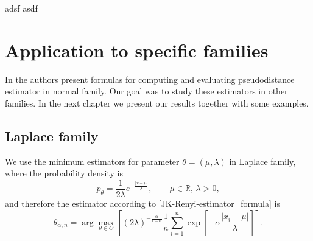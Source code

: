 {\newpage
adsf
\newpage
asdf
\newpage

\section{Application to specific families}

In \cite{Vajda2009} the authors present formulas for computing and evaluating \R pseudodistance estimator in normal family. Our goal was to study these estimators in other families. In the next chapter we present our results together with some examples.


\subsection*{Laplace family}
We use the minimum \R estimators for parameter $\theta = (\mu,\lambda)$ in Laplace family, where the probability density is
\begin{equation}
	p_\theta = \frac{1}{2\lambda} e^{-\frac{|x-\mu|}{\lambda}}, \qquad \mu\in \mathbb{R},\, \lambda>0,
\end{equation}
and therefore the estimator according to \eqref{JK-Renyi-estimator_formula} is
\begin{equation}
	\theta_{\alpha,n} = \arg \max_{\theta \in \Theta} \left[ (2\lambda)^{-\frac{\alpha}{1+\alpha}} \frac{1}{n} \sum_{i=1}^n \exp \left[-\alpha\frac{|x_i-\mu|}{\lambda} \right] \right].
\end{equation}

}
